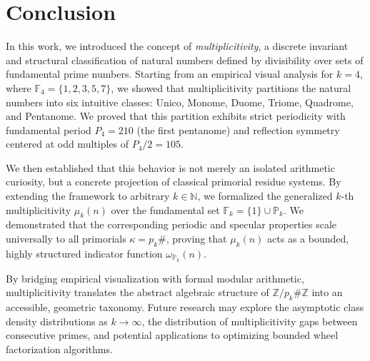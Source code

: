 \documentclass{article}
\begin{document}
\section{Conclusion}
In this work, we introduced the concept of \textit{multiplicitivity}, a discrete invariant and structural classification of natural numbers defined by divisibility over sets of fundamental prime numbers. Starting from an empirical visual analysis for $k=4$, where $\mathbb{F}_4 = \{1, 2, 3, 5, 7\}$, we showed that multiplicitivity partitions the natural numbers into six intuitive classes: Unico, Monome, Duome, Triome, Quadrome, and Pentanome. We proved that this partition exhibits strict periodicity with fundamental period $P_4 = 210$ (the first pentanome) and reflection symmetry centered at odd multiples of $P_4/2 = 105$.

We then established that this behavior is not merely an isolated arithmetic curiosity, but a concrete projection of classical primorial residue systems. By extending the framework to arbitrary $k \in \mathbb{N}$, we formalized the generalized $k$-th multiplicitivity $\mu_k(n)$ over the fundamental set $\mathbb{F}_k = \{1\} \cup \mathbb{P}_k$. We demonstrated that the corresponding periodic and specular properties scale universally to all primorials $\kappa = p_k\#$, proving that $\mu_k(n)$ acts as a bounded, highly structured indicator function $\omega_{\mathbb{P}_k}(n)$.

By bridging empirical visualization with formal modular arithmetic, multiplicitivity translates the abstract algebraic structure of $\mathbb{Z} / p_k\#\mathbb{Z}$ into an accessible, geometric taxonomy. Future research may explore the asymptotic class density distributions as $k \to \infty$, the distribution of multiplicitivity gaps between consecutive primes, and potential applications to optimizing bounded wheel factorization algorithms.

\newpage


\end{document}
